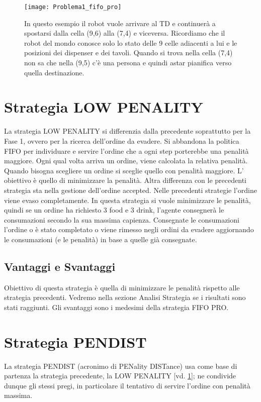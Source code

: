 \begin{SCfigure}[]
\centering
\texttt{[image: Problema1\_fifo\_pro]}
\caption{In questo esempio il robot vuole arrivare al TD e continuerà a spostarsi dalla cella (9,6) alla (7,4) e viceversa. Ricordiamo che il robot del mondo conosce solo lo stato delle 9 celle adiacenti a lui e le posizioni dei dispenser e dei tavoli. Quando si trova nella cella (7,4) non sa che nella (9,5) c'è una persona e quindi astar pianifica verso quella destinazione.}
\label{fig:figure6}
\end{SCfigure}

\section{Strategia LOW PENALITY}
\label{sec:lowpen}
La strategia LOW PENALITY si differenzia dalla precedente soprattutto per la Fase 1, ovvero per la ricerca dell'ordine da evadere. Si abbandona la politica FIFO per individuare e servire l'ordine che a ogni step porterebbe una penalità maggiore. Ogni qual volta arriva un ordine, viene calcolata la relativa penalità. Quando bisogna scegliere un ordine si sceglie quello con penalità maggiore. L' obiettivo è quello di minimizzare la penalità.
Altra differenza con le precedenti strategia sta nella gestione dell'ordine accepted. Nelle precedenti strategie l'ordine viene evaso completamente. In questa strategia si vuole minimizzare le penalità, quindi se un ordine ha richiesto 3 food e 3 drink, l'agente consegnerà le consumazioni secondo la sua massima capienza. Consegnate le consumazioni l'ordine o è stato completato o viene rimesso negli ordini da evadere aggiornando le consumazioni (e le penalità) in base a quelle già consegnate.

\subsection{Vantaggi e Svantaggi}
Obiettivo di questa strategia è quella di minimizzare le penalità rispetto alle strategia precedenti. Vedremo nella sezione Analisi Strategia se i risultati sono stati raggiunti. Gli svantaggi sono i medesimi della strategia FIFO PRO.

\section{Strategia PENDIST}
La strategia PENDIST (acronimo di PENality DISTance) usa come base di partenza la strategia precedente, la LOW PENALITY [vd. \ref{sec:lowpen}]; ne condivide dunque gli stessi pregi, in particolare il tentativo di servire l'ordine con penalità massima.

